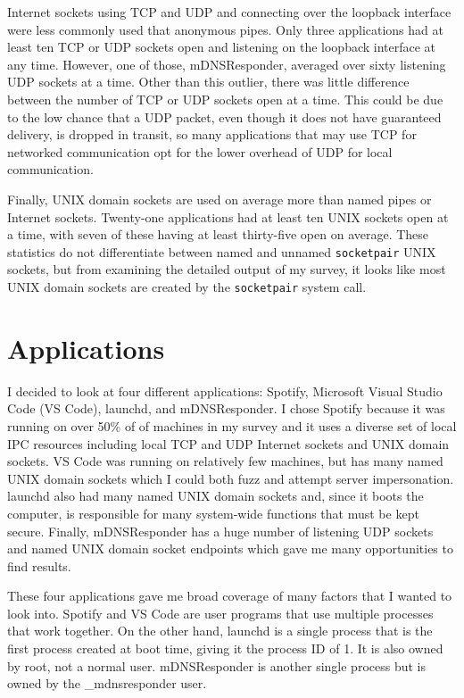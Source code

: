 Internet sockets using TCP and UDP and connecting over the loopback interface were less commonly used that anonymous pipes.  Only three applications had at least ten TCP or UDP sockets open and listening on the loopback interface at any time.  However, one of those, mDNSResponder, averaged over sixty listening UDP sockets at a time.  Other than this outlier, there was little difference between the number of TCP or UDP sockets open at a time.  This could be due to the low chance that a UDP packet, even though it does not have guaranteed delivery, is dropped in transit, so many applications that may use TCP for networked communication opt for the lower overhead of UDP for local communication.

Finally, UNIX domain sockets are used on average more than named pipes or Internet sockets.  Twenty-one applications had at least ten UNIX sockets open at a time, with seven of these having at least thirty-five open on average.  These statistics do not differentiate between named and unnamed \texttt{socketpair} UNIX sockets, but from examining the detailed output of my survey, it looks like most UNIX domain sockets are created by the \texttt{socketpair} system call.

\section{Applications}
\label{sec:applications}
I decided to look at four different applications: Spotify, Microsoft Visual Studio Code (VS Code), launchd, and mDNSResponder.  I chose Spotify because it was running on over 50\% of of machines in my survey and it uses a diverse set of local IPC resources including local TCP and UDP Internet sockets and UNIX domain sockets.  VS Code was running on relatively few machines, but has many named UNIX domain sockets which I could both fuzz and attempt server impersonation.  launchd also had many named UNIX domain sockets and, since it boots the computer, is responsible for many system-wide functions that must be kept secure.  Finally, mDNSResponder has a huge number of listening UDP sockets and named UNIX domain socket endpoints which gave me many opportunities to find results.

These four applications gave me broad coverage of many factors that I wanted to look into.  Spotify and VS Code are user programs that use multiple processes that work together.  On the other hand, launchd is a single process that is the first process created at boot time, giving it the process ID of 1.  It is also owned by root, not a normal user.  mDNSResponder is another single process but is owned by the \_mdnsresponder user.

